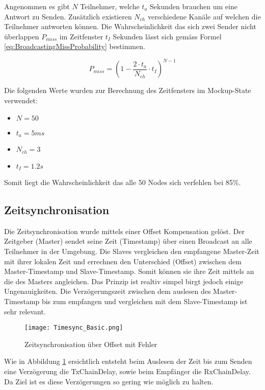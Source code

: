 Angenommen es gibt $N$ Teilnehmer, welche $t_a$ Sekunden brauchen um eine Antwort zu Senden. Zusätzlich existieren $N_{ch}$ verschiedene Kanäle auf welchen die Teilnehmer antworten können. Die Wahrscheinlichkeit das sich zwei Sender nicht überlappen $P_{miss}$ im Zeitfenster $t_I$ Sekunden lässt sich gemäss Formel \ref{eq:BroadcastingMissProbability} bestimmen. \cite{rk_how_to_deal_with_broadcasting_collision_2020}

\begin{equation}\label{eq:BroadcastingMissProbability}
P_{miss} = (1- \frac{2 \cdot t_a}{N_{ch}} \cdot t_I)^{N-1}
\end{equation}

Die folgenden Werte wurden zur Berechnung des Zeitfensters im Mockup-State verwendet:

\begin{itemize}
	\item $N = 50$
	\item $t_a = 5ms$
	\item $N_{ch} = 3$
	\item $t_I = 1.2s$	
\end{itemize} 

Somit liegt die Wahrscheinlichkeit das alle 50 Nodes sich verfehlen bei 85\%. 

\subsection{Zeitsynchronisation}\label{sec:Zeitsynchronisation}

Die Zeitsynchronisation wurde mittels einer Offset Kompensation gelöst. Der Zeitgeber (Master) sendet seine Zeit (Timestamp) über einen Broadcast an alle Teilnehmer in der Umgebung. Die Slaves vergleichen den empfangene Master-Zeit mit ihrer lokalen Zeit und errechnen den Unterschied (Offset) zwischen dem Master-Timestamp und Slave-Timestamp. Somit können sie ihre Zeit mittels an die des Masters angleichen. Das Prinzip ist realtiv simpel birgt jedoch einige Ungenauigkeiten. Die Verzögerungszeit zwischen dem auslesen des Master-Timestamp bis zum empfangen und vergleichen mit dem Slave-Timestamp ist sehr relevant.  

\begin{figure} [H]
	\centering
	\texttt{[image: Timesync\_Basic.png]}
	\caption{Zeitsynchronisation über Offset mit Fehler}
	\label{fig:TimesyncBasicwithErrorP2P}
\end{figure}

Wie in Abbildung \ref{fig:TimesyncBasicwithErrorP2P} ersichtlich entsteht beim Auslesen der Zeit bis zum Senden eine Verzögerung die TxChainDelay, sowie beim Empfänger die RxChainDelay. Da Ziel ist es diese Verzögerungen so gering wie möglich zu halten. 

